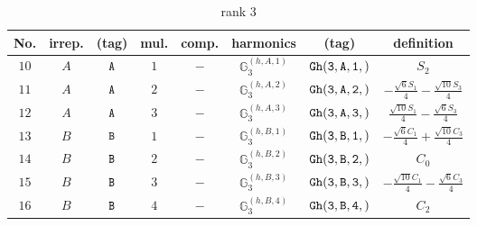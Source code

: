 \documentclass[fleqn,8pt]{jsarticle}
\begin{document}
\begin{table}[ht!]
\begin{center}
\caption{rank 3}
\renewcommand{\arraystretch}{1.3}
\begin{tabular}{cccccccc} \hline \hline
No. & irrep. & (tag) & mul. & comp. & harmonics & (tag) & definition \\ \hline
$ 10 $ & $ A $ & $ {\tt A} $ & $ 1 $ & $ - $ & $ \mathbb{G}_{3}^{(h,A,1)} $ & $ {\tt Gh(3,A,1,)} $ & $ S_{2} $ \\
$ 11 $ & $ A $ & $ {\tt A} $ & $ 2 $ & $ - $ & $ \mathbb{G}_{3}^{(h,A,2)} $ & $ {\tt Gh(3,A,2,)} $ & $ - \frac{\sqrt{6} S_{1}}{4} - \frac{\sqrt{10} S_{3}}{4} $ \\
$ 12 $ & $ A $ & $ {\tt A} $ & $ 3 $ & $ - $ & $ \mathbb{G}_{3}^{(h,A,3)} $ & $ {\tt Gh(3,A,3,)} $ & $ \frac{\sqrt{10} S_{1}}{4} - \frac{\sqrt{6} S_{3}}{4} $ \\
$ 13 $ & $ B $ & $ {\tt B} $ & $ 1 $ & $ - $ & $ \mathbb{G}_{3}^{(h,B,1)} $ & $ {\tt Gh(3,B,1,)} $ & $ - \frac{\sqrt{6} C_{1}}{4} + \frac{\sqrt{10} C_{3}}{4} $ \\
$ 14 $ & $ B $ & $ {\tt B} $ & $ 2 $ & $ - $ & $ \mathbb{G}_{3}^{(h,B,2)} $ & $ {\tt Gh(3,B,2,)} $ & $ C_{0} $ \\
$ 15 $ & $ B $ & $ {\tt B} $ & $ 3 $ & $ - $ & $ \mathbb{G}_{3}^{(h,B,3)} $ & $ {\tt Gh(3,B,3,)} $ & $ - \frac{\sqrt{10} C_{1}}{4} - \frac{\sqrt{6} C_{3}}{4} $ \\
$ 16 $ & $ B $ & $ {\tt B} $ & $ 4 $ & $ - $ & $ \mathbb{G}_{3}^{(h,B,4)} $ & $ {\tt Gh(3,B,4,)} $ & $ C_{2} $ \\
 \hline \hline
\end{tabular}
\end{center}
\end{table}
\end{document}
